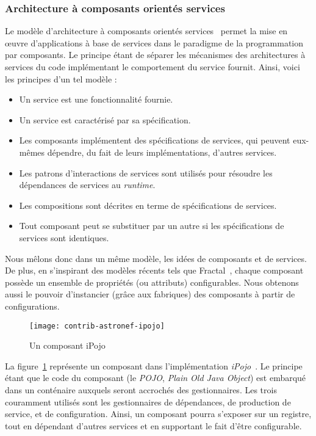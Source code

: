 \subsubsection{Architecture à composants orientés services}
Le modèle d'architecture à composants orientés services~\cite{Cervantes:servicecomponent} permet la mise en œuvre d'applications à base de services dans le paradigme de la programmation par composants. Le principe étant de séparer les mécanismes des architectures à services du code implémentant le comportement du service fournit. Ainsi, voici les principes d'un tel modèle :
\begin{itemize}
    \item Un service est une fonctionnalité fournie.
    \item Un service est caractérisé par sa spécification.
    \item Les composants implémentent des spécifications de services, qui peuvent eux-mêmes dépendre, du fait de leurs implémentations, d'autres services.
    \item Les patrons d'interactions de services sont utilisés pour résoudre les dépendances de services au \textit{runtime}.
    \item Les compositions sont décrites en terme de spécifications de services.
    \item Tout composant peut se substituer par un autre si les spécifications de services sont identiques.
\end{itemize}
Nous mêlons donc dans un même modèle, les idées de composants et de services. De plus, en s'inspirant des modèles récents tels que Fractal~\cite{Bruneton:fractal}, chaque composant possède un ensemble de propriétés (ou attributs) configurables. Nous obtenons aussi le pouvoir d'instancier (grâce aux fabriques) des composants à partir de configurations.

\begin{figure}[ht]
    \centering
    \texttt{[image: contrib-astronef-ipojo]}
    \caption{Un composant iPojo}\label{fig:contrib:astronef:ipojo}
\end{figure}
La figure~\ref{fig:contrib:astronef:ipojo} représente un composant dans l'implémentation \textit{iPojo}~\cite{Escoffier:ipojo}. Le principe étant que le code du composant (le \textit{POJO}, \textit{Plain Old Java Object}) est embarqué dans un conténaire auxquels seront accrochés des gestionnaires. Les trois couramment utilisés sont les gestionnaires de dépendances, de production de service, et de configuration. Ainsi, un composant pourra s'exposer sur un registre, tout en dépendant d'autres services et en supportant le fait d'être configurable.

